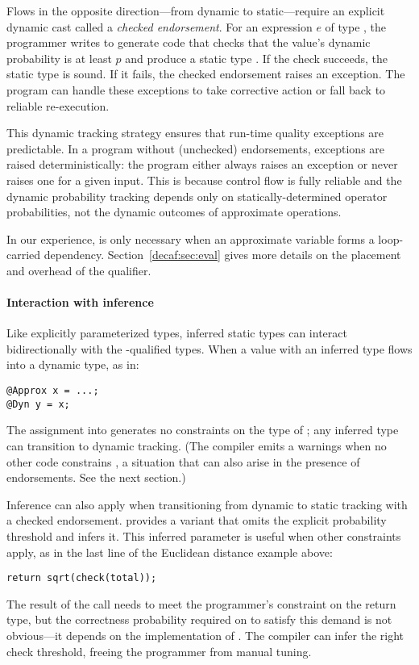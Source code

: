 Flows in the opposite direction---from dynamic to static---require an explicit
dynamic cast called a \emph{checked endorsement}.
For an expression $e$ of type , the programmer writes
 to generate code that checks that the value's
dynamic probability is at least $p$ and produce a static type
.
If the check succeeds, the static type is sound.
If it fails, the checked endorsement raises an exception.
The program can handle these exceptions to take corrective action or fall back
to reliable re-execution.

This dynamic tracking strategy ensures that run-time quality exceptions are predictable.
In a program without (unchecked) endorsements, exceptions are raised
deterministically: the program either always raises an exception or never
raises one for a given input.
This is because control flow is fully reliable and the dynamic probability
tracking depends only on statically-determined operator probabilities, not the
dynamic outcomes of approximate operations.

In our experience,  is only necessary when an approximate variable
forms a loop-carried dependency.
Section~\ref{decaf:sec:eval} gives more details on the placement and overhead of the
 qualifier.

\paragraph{Interaction with inference}
Like explicitly parameterized types, inferred static types can interact bidirectionally
with the -qualified types.
When a value with an inferred type flows into a dynamic type, as in:
%
\begin{lstlisting}
@Approx x = ...;
@Dyn y = x;
\end{lstlisting}
%
The assignment into  generates no constraints on the type of ;
any inferred type can transition to dynamic tracking.
(The compiler emits a warnings when no other code constrains
, a situation that can also arise in the presence of endorsements. See
the next section.)

Inference can also apply when transitioning from dynamic to static tracking
with a checked endorsement.
\lang provides a  variant that omits the explicit probability
threshold and infers it.
This inferred parameter is useful when other constraints apply, as in the
last line of the Euclidean distance example above:
%
\begin{lstlisting}
return sqrt(check(total));
\end{lstlisting}
%
The result of the  call needs to meet the programmer's
 constraint on the return type, but the correctness
probability required on  to satisfy this demand is not
obvious---it depends on the implementation of .
The compiler can infer the right check threshold, freeing the programmer from
manual tuning.


